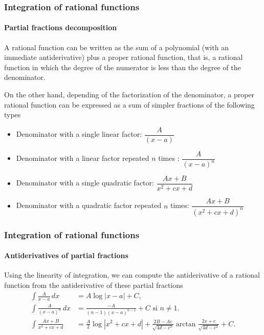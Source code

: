 \begin{frame}
\frametitle{Integration of rational functions}
\framesubtitle{Partial fractions decomposition}
A rational function can be written as the sum of a polynomial (with an immediate antiderivative) plus a proper rational function, that is, a rational function in which the degree of the numerator is less than the degree of the denominator. 

On the other hand, depending of the factorization of the denominator, a proper rational function can be expressed as a sum of simpler fractions of the following types

\begin{itemize}
\item Denominator with a single linear factor: $\dfrac{A}{(x-a)}$
\item Denominator with a linear factor repeated $n$ times : $\dfrac{A}{(x-a)^{n}}$
\item Denominator with a single quadratic factor: $\dfrac{Ax+B}{x^2+cx+d}$
\item Denominator with a quadratic factor repeated $n$ times: $\dfrac{Ax+B}{(x^2+cx+d)^n}$
\end{itemize}
\end{frame}


\begin{frame}
\frametitle{Integration of rational functions}
\framesubtitle{Antiderivatives of partial fractions}
Using the linearity of integration, we can compute the antiderivative of a rational function from the antiderivative of these partial fractions
\begin{align*}
\int \frac{A}{x-a}\,dx &= A\log|x-a|+C,\\
\int \frac{A}{(x-a)^n}\,dx &= \frac{-A}{(n-1)(x-a)^{n-1}}+C \textrm{ si $n\neq 1$}.\\
\int \frac{Ax+B}{x^2+cx+d} &= \frac{A}{2}\log|x^2+cx+d|+\frac{2B-Ac}{\sqrt{4d-c^2}}\arctan \frac{2x+c}{\sqrt{4d-c^2}}+C.
\end{align*}
\end{frame}


